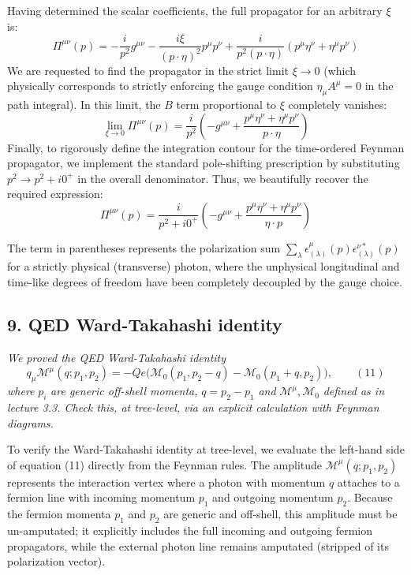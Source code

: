 Having determined the scalar coefficients, the full propagator for an arbitrary $\xi$ is:
\[
    \Pi^{\mu\nu}(p) = -\frac{i}{p^2} g^{\mu\nu} - \frac{i\xi}{(p \cdot \eta)^2} p^\mu p^\nu + \frac{i}{p^2(p \cdot \eta)} (p^\mu \eta^\nu + \eta^\mu p^\nu)
\]
We are requested to find the propagator in the strict limit $\xi \to 0$ (which physically corresponds to strictly enforcing the gauge condition $\eta_\mu A^\mu = 0$ in the path integral). In this limit, the $B$ term proportional to $\xi$ completely vanishes:
\[
    \lim_{\xi \to 0} \Pi^{\mu\nu}(p) = \frac{i}{p^2} \left( -g^{\mu\nu} + \frac{p^\mu \eta^\nu + \eta^\mu p^\nu}{p \cdot \eta} \right)
\]
Finally, to rigorously define the integration contour for the time-ordered Feynman propagator, we implement the standard pole-shifting prescription by substituting $p^2 \to p^2 + i0^+$ in the overall denominator. Thus, we beautifully recover the required expression:
\[
    \Pi^{\mu\nu}(p) = \frac{i}{p^2 + i0^+} \left( -g^{\mu\nu} + \frac{p^\mu \eta^\nu + \eta^\mu p^\nu}{\eta \cdot p} \right)
\]

\begin{remark}
    The term in parentheses represents the polarization sum $\sum_{\lambda} \epsilon_{(\lambda)}^\mu(p) \epsilon_{(\lambda)}^{\nu *}(p)$ for a strictly physical (transverse) photon, where the unphysical longitudinal and time-like degrees of freedom have been completely decoupled by the gauge choice.
\end{remark}


\subsection*{9. QED Ward-Takahashi identity}

\begin{center}
    \textit{We proved the QED Ward-Takahashi identity}
    \[
        q_\mu \mathcal{M}^\mu(q; p_1, p_2) = -Q e \Big( \mathcal{M}_0(p_1, p_2 - q) - \mathcal{M}_0(p_1 + q, p_2) \Big), \qquad (11)
    \]
    \textit{where} $p_i$ \textit{are generic off-shell momenta,} $q = p_2 - p_1$ \textit{and} $\mathcal{M}^\mu, \mathcal{M}_0$ \textit{defined as in lecture 3.3. Check this, at tree-level, via an explicit calculation with Feynman diagrams.}
\end{center}

To verify the Ward-Takahashi identity at tree-level, we evaluate the left-hand side of equation (11) directly from the Feynman rules. The amplitude $\mathcal{M}^\mu(q; p_1, p_2)$ represents the interaction vertex where a photon with momentum $q$ attaches to a fermion line with incoming momentum $p_1$ and outgoing momentum $p_2$. Because the fermion momenta $p_1$ and $p_2$ are generic and off-shell, this amplitude must be un-amputated; it explicitly includes the full incoming and outgoing fermion propagators, while the external photon line remains amputated (stripped of its polarization vector).

